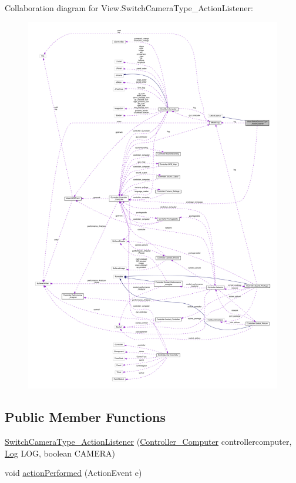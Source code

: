 Collaboration diagram for View.\+Switch\+Camera\+Type\+\_\+\+Action\+Listener\+:
\nopagebreak
\begin{figure}[H]
\begin{center}
\leavevmode
\includegraphics[width=350pt]{class_view_1_1_switch_camera_type___action_listener__coll__graph}
\end{center}
\end{figure}
\subsection*{Public Member Functions}
\begin{DoxyCompactItemize}
\item 
\hyperlink{class_view_1_1_switch_camera_type___action_listener_a18bbecf6470d857ad8f0779984bd417a}{Switch\+Camera\+Type\+\_\+\+Action\+Listener} (\hyperlink{class_controller_1_1_controller___computer}{Controller\+\_\+\+Computer} controllercomputer, \hyperlink{class_model_1_1_log}{Log} L\+O\+G, boolean C\+A\+M\+E\+R\+A)
\item 
void \hyperlink{class_view_1_1_switch_camera_type___action_listener_a5565cb7217f12998aec198104044bda4}{action\+Performed} (Action\+Event e)
\end{DoxyCompactItemize}


